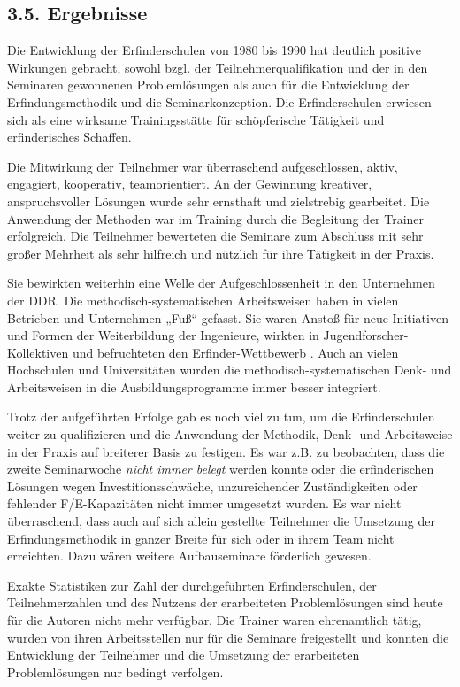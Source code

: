 \documentclass[11pt,a4paper]{article}
\begin{document}
\subsection*{3.5. Ergebnisse}

Die Entwicklung der Erfinderschulen von 1980 bis 1990 hat deutlich positive
Wirkungen gebracht, sowohl bzgl. der Teilnehmerqualifikation und der in den
Seminaren gewonnenen Problemlösungen als auch für die Entwicklung der
Erfindungsmethodik und die Seminarkonzeption. Die Erfinderschulen erwiesen
sich als eine wirksame Trainingsstätte für schöpferische Tätigkeit und
erfinderisches Schaffen.

Die Mitwirkung der Teilnehmer war überraschend aufgeschlossen, aktiv,
engagiert, kooperativ, teamorientiert. An der Gewinnung kreativer,
anspruchsvoller Lösungen wurde sehr ernsthaft und zielstrebig gearbeitet. Die
Anwendung der Methoden war im Training durch die Begleitung der Trainer
erfolgreich. Die Teilnehmer bewerteten die Seminare zum Abschluss mit sehr
großer Mehrheit als sehr hilfreich und nützlich für ihre Tätigkeit in der
Praxis.

Sie bewirkten weiterhin eine Welle der Aufgeschlossenheit in den Unternehmen
der DDR. Die methodisch-systematischen Arbeitsweisen haben in vielen Betrieben
und Unternehmen „Fuß“ gefasst. Sie waren Anstoß für neue Initiativen und
Formen der Weiterbildung der Ingenieure, wirkten in Jugendforscher-Kollektiven
und befruchteten den Erfinder-Wettbewerb \cite{13,14}. Auch an vielen
Hochschulen und Universitäten wurden die methodisch-systematischen Denk- und
Arbeitsweisen in die Ausbildungsprogramme immer besser integriert.

Trotz der aufgeführten Erfolge gab es noch viel zu tun, um die Erfinderschulen
weiter zu qualifizieren und die Anwendung der Methodik, Denk- und Arbeitsweise
in der Praxis auf breiterer Basis zu festigen. Es war z.B. zu beobachten, dass
die zweite Seminarwoche \emph{nicht immer belegt} werden konnte oder die
erfinderischen Lösungen wegen Investitionsschwäche, unzureichender
Zuständigkeiten oder fehlender F/E-Kapazitäten nicht immer umgesetzt wurden.
Es war nicht überraschend, dass auch auf sich allein gestellte Teilnehmer die
Umsetzung der Erfindungsmethodik in ganzer Breite für sich oder in ihrem Team
nicht erreichten. Dazu wären weitere Aufbauseminare förderlich gewesen.

Exakte Statistiken zur Zahl der durchgeführten Erfinderschulen, der
Teilnehmerzahlen und des Nutzens der erarbeiteten Problemlösungen sind heute
für die Autoren nicht mehr verfüg\-bar. Die Trainer waren ehrenamtlich tätig,
wurden von ihren Arbeitsstellen nur für die Seminare freigestellt und konnten
die Entwicklung der Teilnehmer und die Umsetzung der erarbeiteten
Problemlösungen nur bedingt verfolgen.
\end{document}
